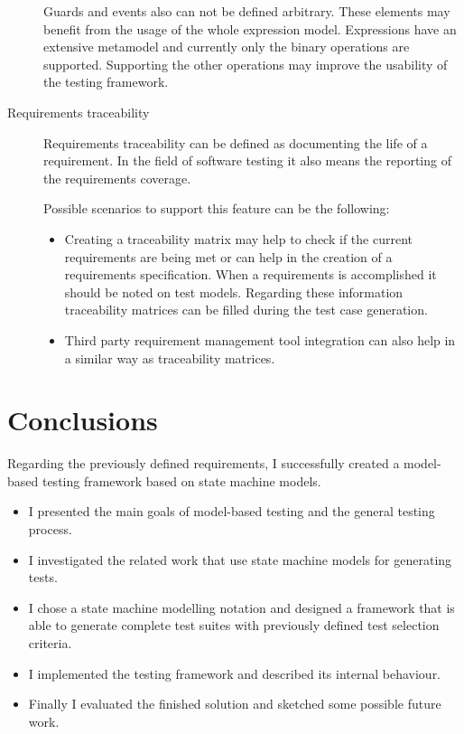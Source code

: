 \begin{description}
	Guards and events also can not be defined arbitrary. These elements may benefit from the usage of the whole expression model. Expressions have an extensive metamodel and currently only the binary operations are supported. Supporting the other operations may improve the usability of the testing framework.
	\item[Requirements traceability] Requirements traceability can be defined as documenting the life of a requirement. In the field of software testing it also means the reporting of the requirements coverage.
	
	Possible scenarios to support this feature can be the following:
	
	\begin{itemize}
		\item Creating a traceability matrix may help to check if the current requirements are being met or can help in the creation of a requirements specification. When a requirements is accomplished it should be noted on test models. Regarding these information traceability matrices can be filled during the test case generation.
		\item Third party requirement management tool integration can also help in a similar way as traceability matrices.
	\end{itemize}
\end{description}


\section{Conclusions}
\label{sec:conclusions}

Regarding the previously defined requirements, I successfully created a model-based testing framework based on state machine models.

\begin{itemize}
	\item I presented the main goals of model-based testing and the general testing process.
	\item I investigated the related work that use state machine models for generating tests.
	\item I chose a state machine modelling notation and designed a framework that is able to generate complete test suites with previously defined test selection criteria.
	\item I implemented the testing framework and described its internal behaviour.
	\item Finally I evaluated the finished solution and sketched some possible future work.
\end{itemize}

